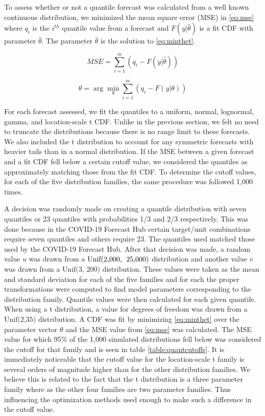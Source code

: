 \documentclass[11pt,notitlepage]{isuthesis}
\begin{document}
To assess whether or not a quantile forecast was calculated from a well
known continuous distribution, we minimized the mean square error (MSE)  
in \eqref{eq:mse} where $q_i$ is
the $i^{th}$ quantile value from a forecast and $F(y| \hat{\theta})$ 
is a fit CDF with 
parameter $\hat{\theta}$. The parameter $\hat{\theta}$ is the solution to 
\eqref{eq:minthet}.

\begin{equation}
  MSE = \sum_{i=1}^m (q_i - F(y| \hat{\theta}))
  \label{eq:mse}
\end{equation}

\begin{equation}
  \hat{\theta} = \arg\min_{\theta} \sum_{i=1}^m (q_i - F(y| \theta))
  \label{eq:minthet}
\end{equation}




For each forecast assessed, we fit the quantiles to a uniform, normal, 
lognormal,
gamma, and location-scale t CDF. Unlike in the previous section, we felt no need
to truncate the distributions because there is no range limit to these 
forecasts. We also included the t distribution to account for any
symmetric forecasts with heavier tails than in a normal distribution.
If the MSE between a given forecast and a fit CDF fell below a certain cutoff
value,
we considered the quantiles as approximately matching those from the fit CDF. To
determine the cutoff values, for each of the five distribution families,
the same
procedure was followed 1,000 times. 

A decision was randomly made on creating a quantile distribution with seven 
quantiles or 23
quantiles with probabilities 1/3 and 2/3 respectively. This was done because 
in the COVID-19 Forecast Hub certain target/unit combinations require 
seven quantiles and others 
require 23. The quantiles used matched those used by the COVID-19 Forecast Hub.
After that decision was made, a random value $u$ was drawn from
a $\mbox{Unif(2,000,\; 25,000)}$ distribution and another value $v$ was drawn
from a $\mbox{Unif(3, 200)}$ distribution. These values were taken as the mean 
and
standard deviation for each of the five families and for each the
proper transformations were computed to find model parameters corresponding to 
the distribution family. 
Quantile values were then calculated for each given quantile. When using 
a t distribution, a value for degrees of freedom was drawn from a 
$\mbox{Unif(2,35)}$ distribution. A CDF
was fit by minimizing \eqref{eq:minthet} over the parameter
vector $\theta$ and the MSE value from \eqref{eq:mse} was 
calculated. The MSE value for which 95\% of the 1,000 simulated distributions
fell below was considered the cutoff for that family and is seen in table 
\ref{table:quantcutoffs}. It is immediately noticeable that the cutoff value 
for the location-scale t family is several orders of magnitude higher than for 
the other distribution families. We believe this is related to the fact that 
the t distribution is a three parameter family where as the other four families 
are two 
parameter families. Thus influencing the optimization methods used enough to 
make such a difference in the cutoff value. 
\end{document}
